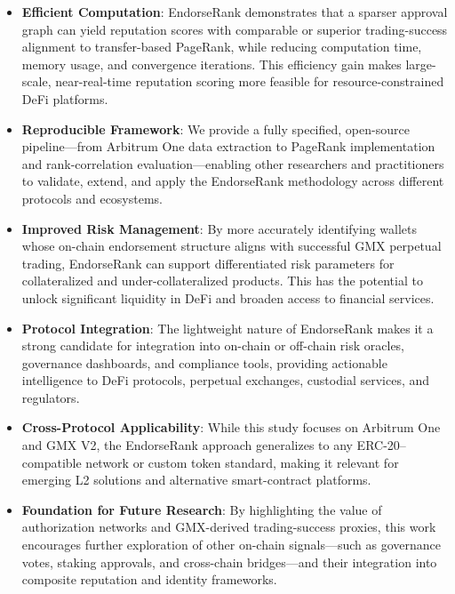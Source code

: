 \begin{itemize}
\item[\textbullet] \textbf{Efficient Computation}: EndorseRank demonstrates that a sparser approval graph can yield reputation scores with comparable or superior trading-success alignment to transfer-based PageRank, while reducing computation time, memory usage, and convergence iterations. This efficiency gain makes large-scale, near-real-time reputation scoring more feasible for resource-constrained DeFi platforms.
\item[\textbullet] \textbf{Reproducible Framework}: We provide a fully specified, open-source pipeline---from Arbitrum One data extraction to PageRank implementation and rank-correlation evaluation---enabling other researchers and practitioners to validate, extend, and apply the EndorseRank methodology across different protocols and ecosystems.
\end{itemize}

\begin{itemize}
\item[\textbullet] \textbf{Improved Risk Management}: By more accurately identifying wallets whose on-chain endorsement structure aligns with successful GMX perpetual trading, EndorseRank can support differentiated risk parameters for collateralized and under-collateralized products. This has the potential to unlock significant liquidity in DeFi and broaden access to financial services.
\item[\textbullet] \textbf{Protocol Integration}: The lightweight nature of EndorseRank makes it a strong candidate for integration into on-chain or off-chain risk oracles, governance dashboards, and compliance tools, providing actionable intelligence to DeFi protocols, perpetual exchanges, custodial services, and regulators.
\end{itemize}

\begin{itemize}
\item[\textbullet] \textbf{Cross-Protocol Applicability}: While this study focuses on Arbitrum One and GMX V2, the EndorseRank approach generalizes to any ERC-20--compatible network or custom token standard, making it relevant for emerging L2 solutions and alternative smart-contract platforms.
\item[\textbullet] \textbf{Foundation for Future Research}: By highlighting the value of authorization networks and GMX-derived trading-success proxies, this work encourages further exploration of other on-chain signals---such as governance votes, staking approvals, and cross-chain bridges---and their integration into composite reputation and identity frameworks.
\end{itemize}
